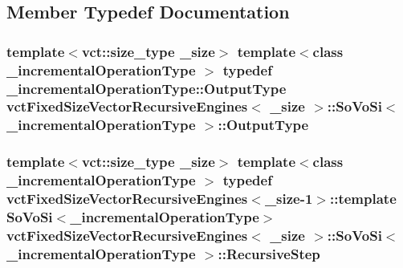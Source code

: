 \subsection{Member Typedef Documentation}
\hypertarget{classvct_fixed_size_vector_recursive_engines_1_1_so_vo_si_abbe36310e19f37465a117598a680abe5}{
\subsubsection[{Output\-Type}]{\setlength{\rightskip}{0pt plus 5cm}template$<$vct\-::size\-\_\-type \-\_\-size$>$ template$<$class \-\_\-incremental\-Operation\-Type $>$ typedef \-\_\-incremental\-Operation\-Type\-::\-Output\-Type {\bf vct\-Fixed\-Size\-Vector\-Recursive\-Engines}$<$ \-\_\-size $>$\-::{\bf So\-Vo\-Si}$<$ \-\_\-incremental\-Operation\-Type $>$\-::{\bf Output\-Type}}}\label{classvct_fixed_size_vector_recursive_engines_1_1_so_vo_si_abbe36310e19f37465a117598a680abe5}
\hypertarget{classvct_fixed_size_vector_recursive_engines_1_1_so_vo_si_ab2cd530a2ba5ab1e525322aa03a14620}{
\subsubsection[{Recursive\-Step}]{\setlength{\rightskip}{0pt plus 5cm}template$<$vct\-::size\-\_\-type \-\_\-size$>$ template$<$class \-\_\-incremental\-Operation\-Type $>$ typedef {\bf vct\-Fixed\-Size\-Vector\-Recursive\-Engines}$<$\-\_\-size-\/1$>$\-::template {\bf So\-Vo\-Si}$<$\-\_\-incremental\-Operation\-Type$>$ {\bf vct\-Fixed\-Size\-Vector\-Recursive\-Engines}$<$ \-\_\-size $>$\-::{\bf So\-Vo\-Si}$<$ \-\_\-incremental\-Operation\-Type $>$\-::{\bf Recursive\-Step}}}\label{classvct_fixed_size_vector_recursive_engines_1_1_so_vo_si_ab2cd530a2ba5ab1e525322aa03a14620}


